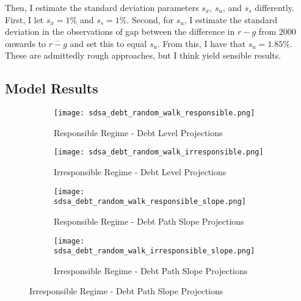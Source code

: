 \documentclass{article}
\begin{document}
Then, I estimate the standard deviation parameters $s_x$, $s_u$, and $s_s$ differently. 
First, I let $s_x = 1\%$ and $s_s = 1\%$.
Second, for $s_u$, I estimate the standard deviation in the observations of gap between the difference in $r-g$ from 2000 onwards to $\bar{r-g}$ and set this to equal $s_u$. From this, I have that $s_u = 1.85\%$.
These are admittedly rough approaches, but I think yield sensible results. 

\subsection{Model Results}

\begin{figure}[hbpt!]
\centering
\begin{subfigure}[b]{0.45\textwidth}
    \texttt{[image: sdsa\_debt\_random\_walk\_responsible.png]}
    \caption{Responsible Regime - Debt Level Projections}
\end{subfigure}
\hfill
\begin{subfigure}[b]{0.45\textwidth}
    \texttt{[image: sdsa\_debt\_random\_walk\_irresponsible.png]}
    \caption{Irresponsible Regime - Debt Level Projections}
\end{subfigure}

\centering
\begin{subfigure}[b]{0.45\textwidth}
    \texttt{[image: sdsa\_debt\_random\_walk\_responsible\_slope.png]}
    \caption{Responsible Regime - Debt Path Slope Projections}
\end{subfigure}
\hfill
\begin{subfigure}[b]{0.45\textwidth}
    \texttt{[image: sdsa\_debt\_random\_walk\_irresponsible\_slope.png]}
    \caption{Irresponsible Regime - Debt Path Slope Projections}
\end{subfigure}
\end{figure}
\end{document}
